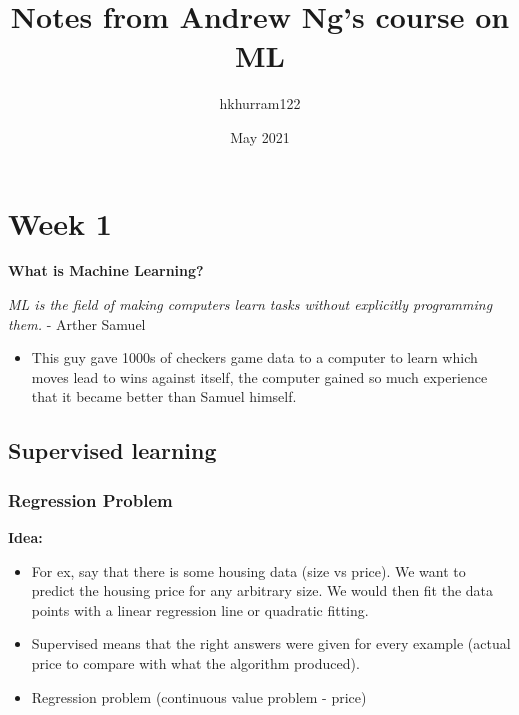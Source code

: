 \documentclass{article}
\title{Notes from Andrew Ng's course on ML}
\author{hkhurram122}
\date{May 2021}
\begin{document}
\maketitle


\tableofcontents




\newpage


\section{Week 1}


\textbf{What is Machine Learning?}

\textit{ML is the field of making computers learn tasks without explicitly programming them.} - Arther Samuel


\begin{itemize}
    \item This guy gave 1000s of checkers game data to a computer to learn which moves lead to wins against itself, the computer gained so much experience that it became better than Samuel himself.
\end{itemize}



\subsection{Supervised learning}




\subsubsection{Regression Problem}

\begin{mybox}
\textbf{Idea:}
\begin{itemize}
    \item For ex, say that there is some housing data (size vs price). We want to predict the housing price for any arbitrary size. We would then fit the data points with a linear regression line or quadratic fitting.

    \item Supervised means that the right answers were given for every example (actual price to compare with what the algorithm produced).

    \item Regression problem (continuous value problem - price)
\end{itemize}
\end{mybox}
\end{document}
